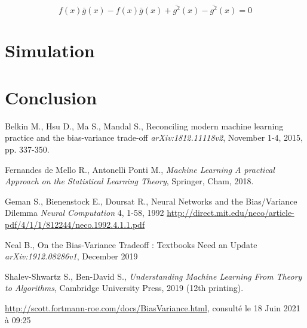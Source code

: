 \documentclass[a4paper]{article}
\begin{document}
\begin{equation}
	\label{intermediate_proof_b_5}
	f(x)\bar{g}(x) - f(x)\bar{g}(x) + \bar{g^2}(x) -\bar{g^2}(x) = 0
\end{equation}

\newpage

\section{Simulation}
 
\newpage

\section{Conclusion}

\newpage

\begin{thebibliography}{9}
	
	Belkin M., Hsu D., Ma S., Mandal S.,
	Reconciling modern machine learning practice and the bias-variance trade-off
	\textit{arXiv:1812.11118v2}, November 1-4, 2015, pp. 337-350.
	
	Fernandes de Mello R., Antonelli Ponti M.,
	\textit{Machine Learning A practical Approach on the Statistical Learning Theory},
	Springer, Cham, 2018.
	
	Geman S., Bienenstock E., Doursat R.,
	Neural Networks and the Bias/Variance Dilemma
	\textit{Neural Computation} 4, 1-58, 1992
	\url{http://direct.mit.edu/neco/article-pdf/4/1/1/812244/neco.1992.4.1.1.pdf}
	
	Neal B.,
	On the Bias-Variance Tradeoff : Textbooks Need an Update
	\textit{arXiv:1912.08286v1}, December 2019
	
	Shalev-Shwartz S., Ben-David S.,
	\textit{Understanding Machine Learning From Theory to Algorithms},
	Cambridge University Press, 2019 (12th printing).
	
	\url{http://scott.fortmann-roe.com/docs/BiasVariance.html},
	consulté le 18 Juin 2021 à 09:25
	
	
\end{thebibliography}
\newpage

\listoffigures
\newpage
\end{document}
